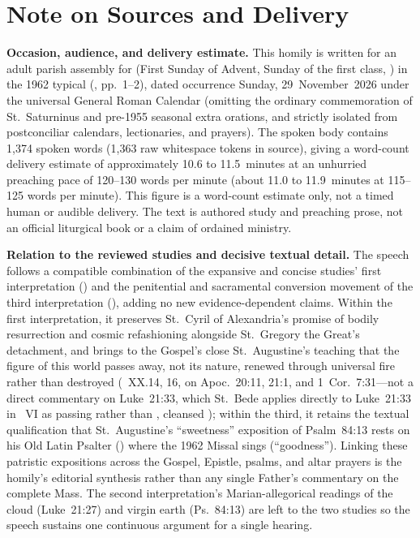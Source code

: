 \section{Note on Sources and Delivery}

\textbf{Occasion, audience, and delivery estimate.} This homily is written for an adult parish assembly for  (First Sunday of Advent, Sunday of the first class, ) in the 1962 typical  (, pp.~1--2), dated occurrence Sunday, 29~November~2026 under the universal General Roman Calendar (omitting the ordinary commemoration of St.~Saturninus and pre-1955 seasonal extra orations, and strictly isolated from postconciliar calendars, lectionaries, and prayers). The spoken body contains 1,374 spoken words (1,363 raw whitespace tokens in source), giving a word-count delivery estimate of approximately 10.6 to 11.5~minutes at an unhurried preaching pace of 120--130 words per minute (about 11.0 to 11.9~minutes at 115--125 words per minute). This figure is a word-count estimate only, not a timed human or audible delivery. The text is authored study and preaching prose, not an official liturgical book or a claim of ordained ministry.

\textbf{Relation to the reviewed studies and decisive textual detail.} The speech follows a compatible combination of the expansive and concise studies' first interpretation () and the penitential and sacramental conversion movement of the third interpretation (), adding no new evidence-dependent claims. Within the first interpretation, it preserves St.~Cyril of Alexandria's promise of bodily resurrection and cosmic refashioning alongside St.~Gregory the Great's detachment, and brings to the Gospel's close St.~Augustine's teaching that the figure of this world passes away, not its nature, renewed through universal fire rather than destroyed (~XX.14, 16, on Apoc.~20:11, 21:1, and 1~Cor.~7:31---not a direct commentary on Luke~21:33, which St.~Bede applies directly to Luke~21:33 in ~VI as passing  rather than , cleansed ); within the third, it retains the textual qualification that St.~Augustine's ``sweetness'' exposition of Psalm~84:13 rests on his Old Latin Psalter () where the 1962 Missal sings  (``goodness''). Linking these patristic expositions across the Gospel, Epistle, psalms, and altar prayers is the homily's editorial synthesis rather than any single Father's commentary on the complete Mass. The second interpretation's Marian-allegorical readings of the cloud (Luke~21:27) and virgin earth (Ps.~84:13) are left to the two studies so the speech sustains one continuous argument for a single hearing.

